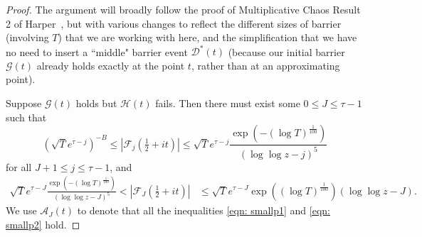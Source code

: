 \documentclass[12pt, notitlepage]{amsart}
\numberwithin{equation}{section}
\theoremstyle{remark}
\theoremstyle{definition}
\theoremstyle{remark}
\numberwithin{equation}{section}
\begin{document}
\begin{proof}
The argument will broadly follow the proof of Multiplicative Chaos Result 2 of Harper~\cite{Harperlargevalue}, but with various changes to reflect the different sizes of barrier (involving $T$) that we are working with here, and the simplification that we have no need to insert a ``middle" barrier event $\mathcal{D}^{*}(t)$ (because our initial barrier $\mathcal{G}(t)$ already holds exactly at the point $t$, rather than at an approximating point).

Suppose $\mathcal{G}(t)$ holds but $\mathcal{H}(t)$ fails. Then there must exist some $0\le J \le \tau-1$ such that 
\begin{equation}\label{eqn: smallp1}
(  \sqrt{T}e^{\tau-j})^{-B} \le |{\mathcal F}_j(\tfrac 12+it)|  \le \sqrt{T} e^{\tau-j}  \frac{\exp(-(\log T)^{\frac 1{100}})}{(\log \log z - j)^{5}}  
\end{equation}
for all $J+1\le j \le \tau-1$, and 
\begin{equation}\label{eqn: smallp2}
   \begin{split}
       \sqrt{T} e^{\tau-J} \frac{\exp(-(\log T)^{\frac 1{100}})}{(\log \log z - J)^{5}}  <  |{\mathcal F}_J(\tfrac 12+it)| & \le \sqrt{T} e^{\tau-J} \exp((\log T)^{\frac 1{100}})  (\log \log z - J).
   \end{split}  
\end{equation}
We use ${\mathcal A}_J(t)$ to denote that all the inequalities \eqref{eqn: smallp1} and \eqref{eqn: smallp2} hold. 


\end{proof}
\end{document}
